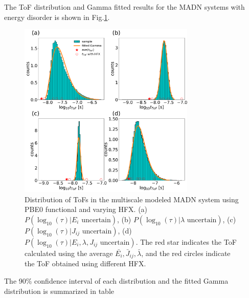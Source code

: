 \documentclass[letterpaper,12pt]{article}
\begin{document}
The ToF distribution and Gamma fitted results for the MADN systems with energy disorder is shown in Fig.\ref{fig:mle_MADN_withE}.
%
\begin{figure}[H]
    \centering
    \includegraphics[width=0.75\textwidth]{figs/MADN_HFX/fig_mle_MADN_withE.pdf}
    \caption{Distribution of ToFs in the multiscale modeled MADN system using PBE0 functional and varying HFX. 
    (a) $P(\log_{10}(\tau)|E_i \text{ uncertain})$, 
    (b) $P(\log_{10}(\tau)|\lambda \text{ uncertain})$, 
    (c) $P(\log_{10}(\tau)|J_{ij} \text{ uncertain})$, 
    (d) $P(\log_{10}(\tau)|E_i, \lambda, J_{ij} \text{ uncertain})$. The red star indicates the ToF calculated using the average $\bar{E_i}, \bar{J}_{ij}, \bar{\lambda}$, and the red circles indicate the ToF obtained using different HFX.}
    \label{fig:mle_MADN_withE}
\end{figure}
%

The 90\% confidence interval of each distribution and the fitted Gamma distribution is summarized in table 
\end{document}
